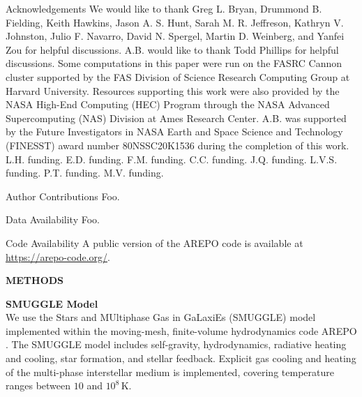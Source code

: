 \documentclass{natureprintstyle}
\begin{document}



\begin{addendum}
  
\item [Acknowledgements] We would like to thank Greg L. Bryan, Drummond B.
Fielding, Keith Hawkins, Jason A. S. Hunt, Sarah M. R. Jeffreson, Kathryn V.
Johnston, Julio F. Navarro, David N. Spergel, Martin D. Weinberg, and Yanfei
Zou for helpful discussions. A.B. would like to thank Todd Phillips for
helpful discussions. Some computations in this paper were run on the FASRC
Cannon cluster supported by the FAS Division of Science Research Computing
Group at Harvard University. Resources supporting this work were also provided
by the NASA High-End Computing (HEC) Program through the NASA Advanced
Supercomputing (NAS) Division at Ames Research Center. A.B. was supported by
the Future Investigators in NASA Earth and Space Science and Technology
(FINESST) award number 80NSSC20K1536 during the completion of this work. L.H.
funding. E.D. funding. F.M. funding. C.C. funding. J.Q. funding. L.V.S.
funding. P.T. funding. M.V. funding.

\item[Author Contributions] Foo.

  \item[Data Availability] Foo.
    
  \item[Code Availability] A public version of the AREPO code is available at
  \url{https://arepo-code.org/}.
    
\end{addendum}



\FloatBarrier
\newpage

\setcounter{page}{1}
\setcounter{figure}{0}
\setcounter{table}{0}
\renewcommand{\figurename}{Extended Data Figure}
\renewcommand{\thetable}{Extended Data \arabic{table}}

\noindent
{\bf \Large \uppercase{Methods} }

\bigskip

\noindent
{\bf SMUGGLE Model}
\\
\noindent
We use the Stars and MUltiphase Gas in GaLaxiEs (SMUGGLE) model
\cite{2019MNRAS.489.4233M} implemented within the moving-mesh, finite-volume
hydrodynamics code AREPO \cite{2010MNRAS.401..791S}. The SMUGGLE model
includes self-gravity, hydrodynamics, radiative heating and cooling, star
formation, and stellar feedback. Explicit gas cooling and heating of the
multi-phase interstellar medium is implemented, covering temperature ranges
between $10$ and $10^8\,\textrm{K}$.
\end{document}
